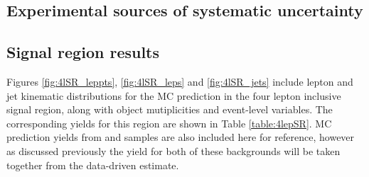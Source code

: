 \subsection{Experimental sources of systematic uncertainty}

\subsection{Signal region results}
Figures \ref{fig:4lSR_leppts}, \ref{fig:4lSR_leps} and \ref{fig:4lSR_jets} include lepton and jet kinematic distributions for the MC prediction in the four lepton inclusive signal region, along with object mutiplicities and event-level variables. 
The corresponding yields for this region are shown in Table \ref{table:4lepSR}. 
MC prediction yields from \ttbar and \zj samples are also included here for reference, however as discussed previously the yield for both of these backgrounds will be taken together from the data-driven estimate. 

